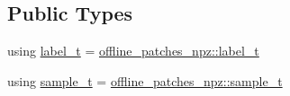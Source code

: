 \subsection*{Public Types}
\begin{DoxyCompactItemize}
\item 
using \hyperlink{classlbann_1_1data__reader__triplet_a7b18fbd40987c99e1c839efc12567fb7}{label\+\_\+t} = \hyperlink{classlbann_1_1offline__patches__npz_ae0ed6bf62b2be1814964206522ed4e05}{offline\+\_\+patches\+\_\+npz\+::label\+\_\+t}
\item 
using \hyperlink{classlbann_1_1data__reader__triplet_adddc55e0424d38b60ac5f55c16990bb7}{sample\+\_\+t} = \hyperlink{classlbann_1_1offline__patches__npz_a61405205f907a697515786d0a9e7858a}{offline\+\_\+patches\+\_\+npz\+::sample\+\_\+t}
\end{DoxyCompactItemize}
